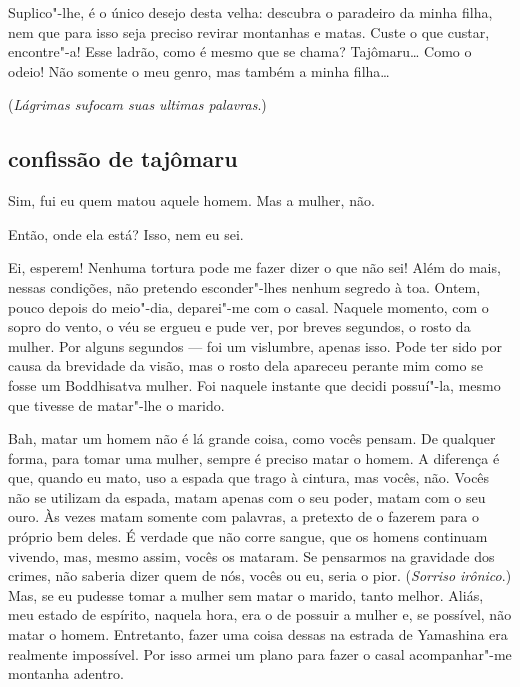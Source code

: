 Suplico"-lhe, é o único desejo desta velha: descubra o paradeiro da minha
filha, nem que para isso seja preciso revirar montanhas e matas. Custe
o que custar, encontre"-a! Esse ladrão, como é mesmo que se chama?
Tajômaru\ldots{} Como o odeio! Não somente o meu genro, mas também a minha
filha\ldots{}

(\textit{Lágrimas sufocam suas ultimas palavras}.)

\subsection*{confissão de tajômaru}

Sim, fui eu quem matou aquele homem. Mas a mulher, não.

Então, onde ela está? Isso, nem eu sei.

Ei, esperem! Nenhuma tortura pode me fazer dizer o que não sei! Além do
mais, nessas condições, não pretendo esconder"-lhes nenhum segredo à
toa. Ontem, pouco depois do meio"-dia, deparei"-me com o casal. Naquele
momento, com o sopro do vento, o véu se ergueu e pude ver, por breves
segundos, o rosto da mulher. Por alguns segundos --- foi um vislumbre,
apenas isso. Pode ter sido por causa da brevidade da visão, mas o rosto
dela  apareceu perante mim como se fosse um Boddhisatva mulher. Foi
naquele instante que decidi possuí"-la, mesmo que tivesse de matar"-lhe o
marido.

Bah, matar um homem não é lá grande coisa, como vocês pensam. De
qualquer forma, para tomar uma mulher, sempre é preciso matar o homem.
A diferença é que, quando eu mato, uso a espada que trago à cintura,
mas vocês, não. Vocês não se utilizam da espada, matam apenas com o seu
poder, matam com o seu ouro. Às vezes matam somente com palavras, a
pretexto de o fazerem para o próprio bem deles. É verdade que não corre
sangue, que os homens continuam vivendo, mas, mesmo assim, vocês os
mataram. Se pensarmos na gravidade dos crimes, não saberia dizer quem
de nós, vocês ou eu, seria o pior. (\textit{Sorriso irônico}.) Mas, se eu
pudesse tomar a mulher sem matar o marido, tanto melhor. Aliás, meu
estado de espírito, naquela hora, era o de possuir a mulher e, se
possível, não matar o homem. Entretanto, fazer uma coisa dessas na
estrada de Yamashina era realmente impossível. Por isso armei um plano
para fazer o casal acompanhar"-me montanha adentro.

